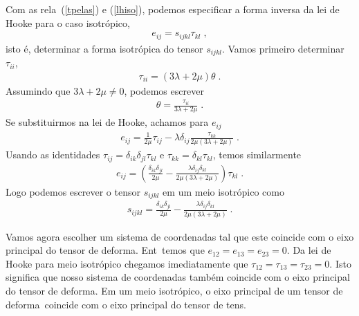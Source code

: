 Com as rela\coes\ (\ref{tpelas}) e (\ref{lhiso}), podemos
especificar a forma inversa da lei de Hooke para o caso
isotr\'opico,
\begin{eqnarray}
e_{ij} = s_{ijkl}\tau_{kl} \; ,
\end{eqnarray}
isto \'e, determinar a forma isotr\'opica do tensor
$s_{ijkl}$. Vamos primeiro determinar $\tau_{ii}$,
\begin{eqnarray}
\tau_{ii} = (3\lambda + 2\mu) \theta \; .
\end{eqnarray}
Assumindo que $3\lambda + 2\mu \neq 0$, podemos escrever
\begin{eqnarray}
\theta = \frac{\tau_{ii}}{3\lambda + 2\mu} \; .
\end{eqnarray} 
Se substituirmos na lei de Hooke, achamos para $e_{ij}$
\begin{eqnarray}
e_{ij} = \frac{1}{2\mu} \tau_{ij} - \lambda \delta_{ij}
\frac{\tau_{kk}}{2\mu(3\lambda + 2\mu)} \; .
\end{eqnarray}
Usando as identidades $\tau_{ij} = \delta_{ik}\delta_{jl}
\tau_{kl}$ e $\tau_{kk}=\delta_{kl} \tau_{kl}$, temos
similarmente
\begin{eqnarray}
e_{ij} = \left( \frac{\delta_{ik}\delta_{jl}}{2\mu} -
\frac{\lambda \delta_{ij} \delta_{kl}}{2\mu(3\lambda +
2\mu)} \right) \tau_{kl} \; .
\end{eqnarray}
Logo podemos escrever o tensor $s_{ijkl}$ em um meio isotr\'opico como
\begin{eqnarray}
s_{ijkl} = \frac{\delta_{ik}\delta_{jl}}{2\mu} -
\frac{\lambda \delta_{ij} \delta_{kl}}{2\mu(3\lambda +
2\mu)} \; .
\end{eqnarray}


Vamos agora escolher um sistema de coordenadas tal que
este coincide com o eixo principal do tensor de
deforma\cao. Ent\ao\ temos que $e_{12}=e_{13}=e_{23}=0$.
Da lei de Hooke para meio isotr\'opico chegamos
imediatamente que $\tau_{12}=\tau_{13}=\tau_{23}=0$.
Isto significa que nosso sistema de coordenadas tamb\'em
coincide com o eixo principal do tensor de deforma\cao.
Em um meio isotr\'opico, o eixo principal de um tensor
de deforma\cao\ coincide com o eixo principal do tensor
de tens\ao.

